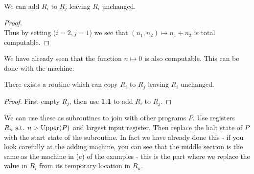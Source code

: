 \documentclass[10pt,a4paper]{article}
\begin{document}
\begin{lemma}
We can add $R_i$ to $R_j$ leaving $R_i$ unchanged.
\end{lemma}
\begin{proof}
\item
\centering
{}\\
Thus by setting ($i=2, j=1$) we see that $(n_1, n_2) \mapsto n_1 + n_2$ is total computable.
\end{proof}
We have already seen that the function $n\mapsto 0$ is also computable. This can be done with the machine:
\begin{center}
\end{center}
\begin{corollary}
There exists a routine which can copy $R_i$ to $R_j$ leaving $R_i$ unchanged.
\end{corollary}
\begin{proof}
First empty $R_j$, then use \textbf{1.1} to add $R_i$ to $R_j$.
\end{proof}
We can use these as subroutines to join with other programs $P$. Use registers $R_n \text{ s.t. } n> \operatorname{Upper}(P)$ and largest input register. Then replace the halt state of $P$ with the start state of the subroutine. In fact we have already done this - if you look carefully at the adding machine, you can see that the middle section is the same as the machine in (c) of the examples - this is the part where we replace the value in $R_i$ from its temporary location in $R_n$.
\end{document}
